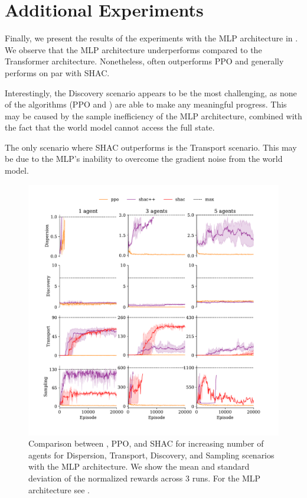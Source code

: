 \section{Additional Experiments}

Finally, we present the results of the experiments with the MLP architecture in . We observe that the MLP architecture underperforms compared to the Transformer architecture. Nonetheless, \fname{} often outperforms PPO and generally performs on par with SHAC.

Interestingly, the Discovery scenario appears to be the most challenging, as none of the algorithms (PPO and \fname{}) are able to make any meaningful progress. This may be caused by the sample inefficiency of the MLP architecture, combined with the fact that the world model cannot access the full state.

The only scenario where SHAC outperforms \fname{} is the Transport scenario. This may be due to the MLP's inability to overcome the gradient noise from the world model.

\begin{figure}[t]
    \centering
    \includegraphics[width=\columnwidth]{figs/main-mlp.pdf}
    \caption{Comparison between \fname{}, PPO, and SHAC for increasing number of agents for Dispersion, Transport, Discovery, and Sampling scenarios with the MLP architecture.
    We show the mean and standard deviation of the normalized rewards across $3$ runs. For the MLP architecture see .
    }
    \label{apx:fig:experiments-mlp}

\end{figure}


